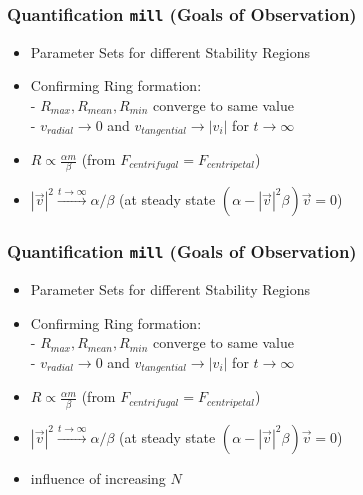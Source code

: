 \documentclass[compress]{beamer}
\begin{document}
\begin{frame}
	\frametitle{Quantification \texttt{mill} \small (Goals of Observation)} \normalsize
	\begin{itemize}
		\item Parameter Sets for different Stability Regions
		\item Confirming Ring formation: \\
			- \( R_{max}, R_{mean}, R_{min} \) converge to same value \\
			- \( v_{radial} \to 0 \) and \( v_{tangential} \to | v_{i} |  \) for \( t \to \infty \)
		\item  \( R \propto \frac{\alpha m}{\beta}\) \small (from  \( F_{centrifugal} = F_{centripetal} \)) \normalsize
		\item \( |\vec{v}|^{2} \xrightarrow{t \to \infty}  \alpha / \beta \) \small(at steady state \( (\alpha - |\vec{v}|^2 \beta ) \vec{v} = 0 \)) 
\normalsize
	\end{itemize}
\end{frame}




\begin{frame}
	\frametitle{Quantification \texttt{mill} \small (Goals of Observation)} \normalsize
	\begin{itemize}
		\item Parameter Sets for different Stability Regions
		\item Confirming Ring formation: \\
			- \( R_{max}, R_{mean}, R_{min} \) converge to same value \\
			- \( v_{radial} \to 0 \) and \( v_{tangential} \to | v_{i} |  \) for \( t \to \infty \)
		\item  \( R \propto \frac{\alpha m}{\beta}\) \small (from  \( F_{centrifugal} = F_{centripetal} \)) \normalsize
		\item \( |\vec{v}|^{2} \xrightarrow{t \to \infty}  \alpha / \beta \) \small(at steady state \( (\alpha - |\vec{v}|^2 \beta ) \vec{v} = 0 \)) 
\normalsize
		\item influence of increasing \( N \)
	\end{itemize}
\end{frame}
\end{document}
